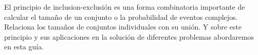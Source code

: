 El principio de inclusion-exclusión es una forma combinatoria importante de calcular el tamaño de un conjunto o la probabilidad de eventos complejos. Relaciona los tamaños de conjuntos individuales con su unión. Y sobre este principio y sus aplicaciones en la solución de diferentes problemas abordaremos en esta guía.
